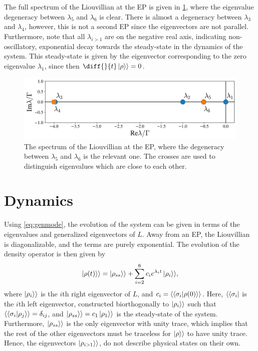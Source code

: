 \documentclass[../main.tex]{subfiles}
\begin{document}
The full spectrum of the Liouvillian at the EP is given in \cref{fig:spec}, where the eigenvalue degeneracy between $\lambda_5$ and $\lambda_6$ is clear. There is almost a degeneracy between $\lambda_3$ and $\lambda_4$, however, this is not a second EP since the eigenvectors are not parallel. Furthermore, note that all $\lambda_{i>1}$ are on the negative real axis, indicating non-oscillatory, exponential decay towards the steady-state in the dynamics of the system. This steady-state is given by the eigenvector corresponding to the zero eigenvalue $\lambda_1$, since then $\diff{}{t}\ket{\rho}\rangle = 0$.
\begin{figure}[H]
    \centering
    \includegraphics[width=0.8\linewidth]{figures/spectrum.png}
    \caption{The spectrum of the Liouvillian at the EP, where the degeneracy between $\lambda_5$ and $\lambda_6$ is the relevant one. The crosses are used to distinguish eigenvalues which are close to each other.}
    \label{fig:spec}
\end{figure}

\section{Dynamics}

Using \cref{eq:genmode}, the evolution of the system can be given in terms of the eigenvalues and generalized eigenvectors of $L$. Away from an EP, the Liouvillian is diagonalizable, and the terms are purely exponential. The evolution of the density operator is then given by
\begin{equation}\label{eq:dynnonep}
    \ket{\rho(t)}\rangle = \ket{\rho_{ss}}\rangle + \sum_{i=2}^6 c_i e^{\lambda_i t} \ket{\rho_i}\rangle,
\end{equation}
where $\ket{\rho_i}\rangle$ is the $i$th right eigenvector of $L$, and $c_i = \langle\braket{\sigma_i|\rho(0)}\rangle$. Here, $\langle\bra{\sigma_i}$ is the $i$th left eigenvector, constructed biorthogonally to $\ket{\rho_i}\rangle$ such that $\langle\braket{\sigma_i|\rho_j}\rangle = \delta_{ij}$, and $\ket{\rho_{ss}}\rangle = c_1 \ket{\rho_1}\rangle$ is the steady-state of the system. Furthermore, $\ket{\rho_{ss}}\rangle$ is the only eigenvector with unity trace, which implies that the rest of the other eigenvectors must be traceless for $\ket{\rho}\rangle$ to have unity trace. Hence, the eigenvectors $\ket{\rho_{i>1}}\rangle$, do not describe physical states on their own.
\end{document}
